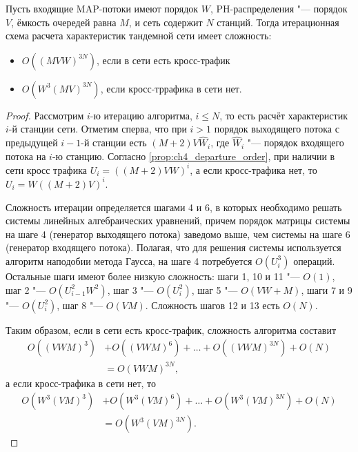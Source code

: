 \begin{prop}\label{prop:ch4_base_algorithm_complexity}
  Пусть входящие MAP-потоки имеют порядок $W$, PH-распределения "--- порядок $V$, ёмкость очередей равна $M$, и сеть содержит $N$ станций. Тогда итерационная схема расчета характеристик тандемной сети имеет сложность:
  \begin{itemize}
	  \item $O((M V W)^{3N})$, если в сети есть кросс-трафик
	  \item $O(W^3 (M V)^{3N})$, если кросс-тррафика в сети нет.
  \end{itemize}
\end{prop}
\begin{proof}
Рассмотрим $i$-ю итерацию алгоритма, $i \leqslant N$, то есть расчёт характеристик $i$-й станции сети. Отметим сперва, что при $i > 1$ порядок выходящего потока с предыдущей $i-1$-й станции есть $(M + 2) V \hat{W}_i$, где $\hat{W}_i$ "--- порядок входящего потока на $i$-ю станцию. Согласно \ref{prop:ch4_departure_order}, при наличии в сети кросс трафика $U_i = ((M+2)VW)^i$, а если кросс-трафика нет, то $U_i = W((M+2)V)^i$.

Сложность итерации определяется шагами 4 и 6, в которых необходимо решать системы линейных алгебраических уравнений, причем порядок матрицы системы на шаге 4 (генератор выходящего потока) заведомо выше, чем системы на шаге 6 (генератор входящего потока). Полагая, что для решения системы используется алгоритм наподобии метода Гаусса, на шаге 4 потребуется $O(U_i^3)$ операций. Остальные шаги имеют более низкую сложность: шаги 1, 10 и 11 "--- $O(1)$, шаг 2 "--- $O(U_{i-1}^2 W^2)$, шаг 3 "--- $O(U_i^2)$, шаг 5 "--- $O(VW + M)$, шаги 7 и 9 "--- $O(U_i^2)$, шаг 8 "--- $O(VM)$. Сложность шагов 12 и 13 есть $O(N)$.

Таким образом, если в сети есть кросс-трафик, сложность алгоритма составит
$$
  \begin{aligned}
    O((VWM)^3) &+ O((VWM)^6) + \dots + O((VWM)^{3N}) + O(N) \\
    &= O(VWM)^{3N},
  \end{aligned}
$$
а если кросс-трафика в сети нет, то
$$
  \begin{aligned}
    O(W^3 (VM)^3) &+ O(W^3 (VM)^6) + \dots + O(W^3 (VM)^{3N}) + O(N) \\
    &= O(W^3 (VM)^{3N}).
  \end{aligned}
$$

\end{proof}

